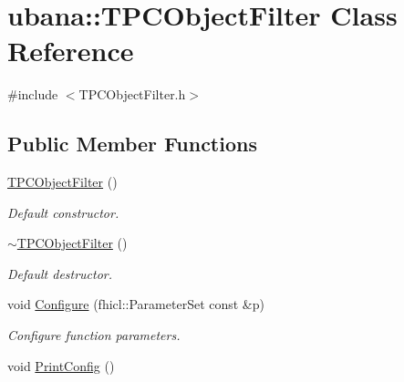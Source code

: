 \hypertarget{classubana_1_1TPCObjectFilter}{\section{ubana\-:\-:\-T\-P\-C\-Object\-Filter \-Class \-Reference}
\label{classubana_1_1TPCObjectFilter}
}


{\ttfamily \#include $<$\-T\-P\-C\-Object\-Filter.\-h$>$}

\subsection*{\-Public \-Member \-Functions}
\begin{DoxyCompactItemize}
\item 
\hypertarget{classubana_1_1TPCObjectFilter_aa898a1ea96ce8bf1bf164111157a497d}{\hyperlink{classubana_1_1TPCObjectFilter_aa898a1ea96ce8bf1bf164111157a497d}{\-T\-P\-C\-Object\-Filter} ()}\label{classubana_1_1TPCObjectFilter_aa898a1ea96ce8bf1bf164111157a497d}

\begin{DoxyCompactList}\small\item\em \-Default constructor. \end{DoxyCompactList}\item 
\hypertarget{classubana_1_1TPCObjectFilter_ad8a3f726f247b5651272397ee344ef1e}{\hyperlink{classubana_1_1TPCObjectFilter_ad8a3f726f247b5651272397ee344ef1e}{$\sim$\-T\-P\-C\-Object\-Filter} ()}\label{classubana_1_1TPCObjectFilter_ad8a3f726f247b5651272397ee344ef1e}

\begin{DoxyCompactList}\small\item\em \-Default destructor. \end{DoxyCompactList}\item 
\hypertarget{classubana_1_1TPCObjectFilter_a49a5f29b105c442cc8fe97d05066c72a}{void \hyperlink{classubana_1_1TPCObjectFilter_a49a5f29b105c442cc8fe97d05066c72a}{\-Configure} (fhicl\-::\-Parameter\-Set const \&p)}\label{classubana_1_1TPCObjectFilter_a49a5f29b105c442cc8fe97d05066c72a}

\begin{DoxyCompactList}\small\item\em \-Configure function parameters. \end{DoxyCompactList}\item 
\hypertarget{classubana_1_1TPCObjectFilter_a542681a3872f6662e58e83330dddfe8c}{void \hyperlink{classubana_1_1TPCObjectFilter_a542681a3872f6662e58e83330dddfe8c}{\-Print\-Config} ()}\label{classubana_1_1TPCObjectFilter_a542681a3872f6662e58e83330dddfe8c}


\end{DoxyCompactItemize}
